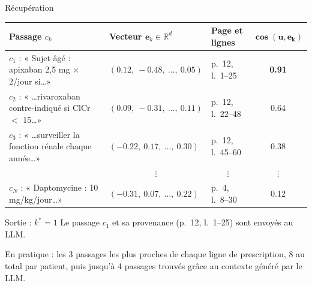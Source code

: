 \documentclass{beamer}
\begin{document}
\begin{frame}{Récupération}
  \centering
  \scriptsize
  \renewcommand{\arraystretch}{1.4}
  \begin{tabular}{>{\raggedright\arraybackslash}p{3.9cm}ll|c}
    \toprule
    \textbf{Passage $c_k$} & \textbf{Vecteur $\mathbf{e}_k \in \mathbb{R}^d$} & \textbf{Page et lignes} & $\boldsymbol{\cos(\mathbf{u}, \mathbf{e}_k)}$ \\
    \midrule
    \rowcolor{puigreen!15}
    $c_1$ : « Sujet âgé : apixaban 2,5 mg $\times$ 2/jour si\dots » & $(0.12,\ -0.48,\ \dots,\ 0.05)$ & p.~12, l.~1--25 & \textbf{0.91} \\
    $c_2$ : « \dots rivaroxaban contre-indiqué si ClCr $<$ 15\dots » & $(0.09,\ -0.31,\ \dots,\ 0.11)$ & p.~12, l.~22--48 & 0.64 \\
    $c_3$ : « \dots surveiller la fonction rénale chaque année\dots » & $(-0.22,\ 0.17,\ \dots,\ 0.30)$ & p.~12, l.~45--60 & 0.38 \\
    \multicolumn{1}{c}{$\vdots$} & \multicolumn{1}{c}{$\vdots$} & \multicolumn{1}{c|}{$\vdots$} & $\vdots$ \\
    $c_N$ : « Daptomycine : 10 mg/kg/jour\dots » & $(-0.31,\ 0.07,\ \dots,\ 0.22)$ & p.~4, l.~8--30 & 0.12 \\
    \bottomrule
  \end{tabular}

  \vspace{0.6em}
  \small
  \begin{exampleblock}{Sortie : $k^* = 1$}
    \centering
    Le passage $c_1$ et sa provenance (p.~12, l.~1--25) sont envoyés au LLM.
  \end{exampleblock}
  {\scriptsize En pratique : les 3 passages les plus proches de chaque ligne de prescription, 8 au total par patient, puis jusqu'à 4 passages trouvés grâce au contexte généré par le LLM.}
\end{frame}
\end{document}
